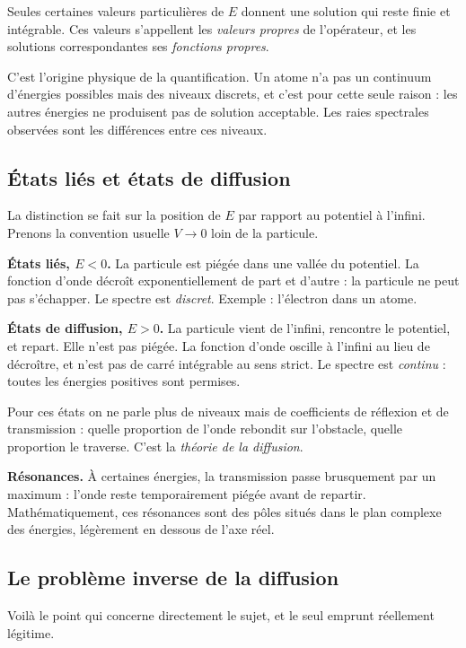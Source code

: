 \documentclass[11pt,a4paper]{article}
\begin{document}
Seules certaines valeurs particulières de $E$ donnent une solution qui reste finie et intégrable. Ces
valeurs s'appellent les \emph{valeurs propres} de l'opérateur, et les solutions correspondantes ses
\emph{fonctions propres}.

C'est l'origine physique de la quantification. Un atome n'a pas un continuum d'énergies possibles mais
des niveaux discrets, et c'est pour cette seule raison : les autres énergies ne produisent pas de
solution acceptable. Les raies spectrales observées sont les différences entre ces niveaux.

\subsection{États liés et états de diffusion}

La distinction se fait sur la position de $E$ par rapport au potentiel à l'infini. Prenons la
convention usuelle $V \to 0$ loin de la particule.

\textbf{États liés, $E < 0$.} La particule est piégée dans une vallée du potentiel. La fonction d'onde
décroît exponentiellement de part et d'autre : la particule ne peut pas s'échapper. Le spectre est
\emph{discret}. Exemple : l'électron dans un atome.

\textbf{États de diffusion, $E > 0$.} La particule vient de l'infini, rencontre le potentiel, et
repart. Elle n'est pas piégée. La fonction d'onde oscille à l'infini au lieu de décroître, et n'est pas
de carré intégrable au sens strict. Le spectre est \emph{continu} : toutes les énergies positives sont
permises.

Pour ces états on ne parle plus de niveaux mais de coefficients de réflexion et de transmission :
quelle proportion de l'onde rebondit sur l'obstacle, quelle proportion le traverse. C'est la
\emph{théorie de la diffusion}.

\textbf{Résonances.} À certaines énergies, la transmission passe brusquement par un maximum : l'onde
reste temporairement piégée avant de repartir. Mathématiquement, ces résonances sont des pôles situés
dans le plan complexe des énergies, légèrement en dessous de l'axe réel.

\subsection{Le problème inverse de la diffusion}

Voilà le point qui concerne directement le sujet, et le seul emprunt réellement légitime.
\end{document}
